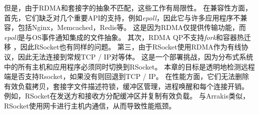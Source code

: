 但是，由于RDMA和套接字的抽象不匹配，这些工作有局限性。
在兼容性方面，首先，它们缺乏对几个重要API的支持，例如\textit {epoll}，因此它与许多应用程序不兼容，包括Nginx，Memcached，Redis等。
这是因为RDMA仅提供传输功能，而\textit {epoll}是与OS事件通知集成的文件抽象。
其次，RDMA QP不支持\textit {fork}和容器热迁移 \cite{nsdi19freeflow}，因此RSocket也有同样的问题。
第三，由于RSocket使用RDMA作为有线协议，因此无法连接到常规TCP / IP对等体。
这是一个部署挑战，因为分布式系统中的所有主机和应用程序必须同时切换到RSocket。
本章的目标是透明地检测远程端是否支持Rsocket，如果没有则回退到TCP / IP。
在性能方面，它们无法删除有效负载拷贝，套接字文件描述符锁，缓冲区管理，进程唤醒和每个连接开销。
例如，RSocket在发送方和接收方分配缓冲区并复制有效负载。
与Arrakis类似，RSocket使用网卡进行主机内通信，从而导致性能瓶颈。





